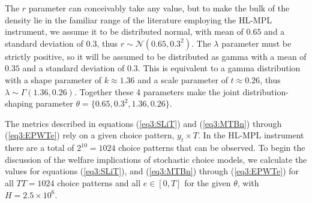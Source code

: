 \documentclass[../main.tex]{subfiles}
\begin{document}
The $r$ parameter can conceivably take any value, but to make the bulk of the density lie in the familiar range of the literature employing the HL-MPL instrument, we assume it to be distributed normal, with mean of $0.65$ and a standard deviation of $0.3$, thus $r \sim \mathcal{N}(0.65 , 0.3^2 )$.
The $\lambda$ parameter must be strictly positive, so it will be assumed to be distributed as gamma with a mean of $0.35$ and a standard deviation of $0.3$.
This is equivalent to a gamma distribution with a shape parameter of $k \approx 1.36$ and a scale parameter of $t\approx0.26$, thus $\lambda \sim \Gamma(1.36 , 0.26)$.
Together these 4 parameters make the joint distribution-shaping parameter $\theta=\{0.65 ,0.3^2, 1.36 , 0.26\}$.

The metrics described in equations (\ref{eq3:SLiT}) and (\ref{eq3:MTBn}) through (\ref{eq3:EPWTe}) rely on a given choice pattern, $y_t \times T$.
In the HL-MPL instrument there are a total of $2^{10}=1024$ choice patterns that can be observed.
To begin the discussion of the welfare implications of stochastic choice models, we calculate the values for equations (\ref{eq3:SLiT}), and (\ref{eq3:MTBn}) through (\ref{eq3:EPWTe}) for all $\mathit{TT} =1024$ choice patterns and all $e \in[0,T]$ for the given $\theta$, with $H=2.5 \times 10^6$.
\end{document}

